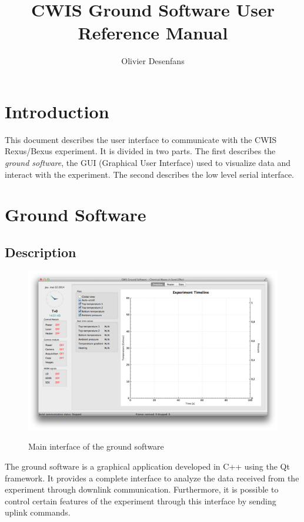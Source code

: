 \documentclass[11pt,a4paper,oneside]{report}
\title{CWIS Ground Software User Reference Manual}
\author{Olivier Desenfans}
\begin{document}
\maketitle

\tableofcontents

\chapter{Introduction}

This document describes the user interface to communicate with the CWIS Rexus/Bexus experiment.
It is divided in two parts.
The first describes the \emph{ground software}, the GUI (Graphical User Interface) used to visualize data and interact with the experiment.
The second describes the low level serial interface.

\chapter{Ground Software}

\section{Description}

\begin{figure}[!h]
\center
\includegraphics[width=15cm]{images/gs_main.png}
\label{image:gs_main}
\caption{Main interface of the ground software}
\end{figure}

The ground software is a graphical application developed in C++ using the Qt framework.
It provides a complete interface to analyze the data received from the experiment through downlink communication.
Furthermore, it is possible to control certain features of the experiment through this interface by sending uplink commands. \\
\end{document}
